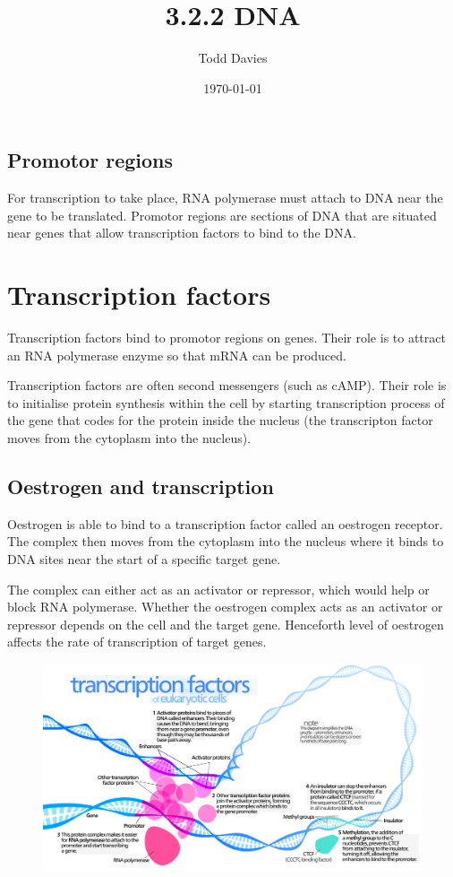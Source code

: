 \documentclass{article}
\author{Todd Davies}
\title{3.2.2 DNA}
\date{\today}
\begin{document}
\lhead{\today}

\maketitle

\subsection*{Promotor regions}
\thispagestyle{empty}

For transcription to take place, RNA polymerase must attach to DNA near the gene
to be translated. Promotor regions are sections of DNA that are situated near
genes that allow transcription factors to bind to the DNA.

\section*{Transcription factors}

Transcription factors bind to promotor regions on genes. Their role is to
attract an RNA polymerase enzyme so that mRNA can be produced.

Transcription factors are often second messengers (such as cAMP). Their role is
to initialise protein synthesis within the cell by starting transcription
process of the gene that codes for the protein inside the nucleus (the
transcripton factor moves from the cytoplasm into the nucleus).

\subsection*{Oestrogen and transcription}

Oestrogen is able to bind to a transcription factor called an oestrogen
receptor. The complex then moves from the cytoplasm into the nucleus where it
binds to DNA sites near the start of a specific target gene.

The complex can either act as an activator or repressor, which would help or
block RNA polymerase. Whether the oestrogen complex acts as an activator or
repressor depends on the cell and the target gene. Henceforth level of oestrogen
affects the rate of transcription of target genes.

\begin{figure}
	\centering
	\includegraphics[scale=0.3, angle=90]{transcriptionfactors}
\end{figure}
\end{document}
